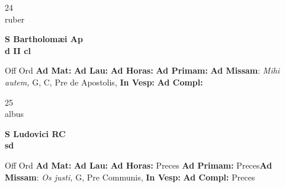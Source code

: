 \documentclass[10pt, openany]{book}
\begin{document}
    \begin{center}
        \begin{minipage}{3.5in}
            \vspace{2em}
            \begin{minipage}{0.5in}
                {\Huge 24} \\
                {\normalsize ruber}
            \end{minipage}
            \begin{minipage}{3.0in}
                \textbf{ \large S Bartholomæi Ap \\
                \textnormal{\normalsize d II cl}}

            \end{minipage}
            \begin{justify}Off Ord
                \textbf{Ad Mat: }
                \textbf{Ad Lau: }
                \textbf{Ad Horas: }
                \textbf{Ad Primam: }\textbf{Ad Missam}: \textit{Mihi autem,} G, C, Pre de Apostolis, 
                \textbf{In Vesp: }
                \textbf{Ad Compl: }
            \end{justify}
        \end{minipage}
    \end{center}

    \begin{center}
        \begin{minipage}{3.5in}
            \vspace{2em}
            \begin{minipage}{0.5in}
                {\Huge 25} \\
                {\normalsize albus}
            \end{minipage}
            \begin{minipage}{3.0in}
                \textbf{ \large S Ludovici RC \\
                \textnormal{\normalsize sd}}

            \end{minipage}
            \begin{justify}Off Ord
                \textbf{Ad Mat: }
                \textbf{Ad Lau: }
                \textbf{Ad Horas: }Preces
                \textbf{Ad Primam: }Preces\textbf{Ad Missam}: \textit{Os justi,} G, Pre Communis, 
                \textbf{In Vesp: }
                \textbf{Ad Compl: }Preces
            \end{justify}
        \end{minipage}
    \end{center}
\end{document}

